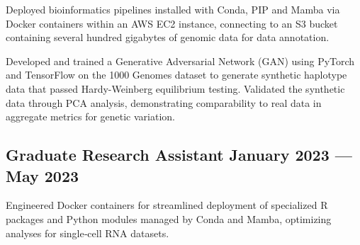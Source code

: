 \begin{zitemize}
\item Deployed bioinformatics pipelines installed with Conda, PIP and Mamba via Docker containers within an AWS EC2 instance, connecting to an S3 bucket containing several hundred gigabytes of genomic data for data annotation.
\item Developed and trained a Generative Adversarial Network (GAN) using PyTorch and TensorFlow on the 1000 Genomes dataset to generate synthetic haplotype data that passed Hardy-Weinberg equilibrium testing. Validated the synthetic data through PCA analysis, demonstrating comparability to real data in aggregate metrics for genetic variation.
\end{zitemize}

\subsection{{Graduate Research Assistant \hfill January 2023 --- May 2023}}
\begin{zitemize}
\item Engineered Docker containers for streamlined deployment of specialized R packages and Python modules managed by Conda and Mamba, optimizing analyses for single‑cell RNA datasets.
\end{zitemize}

